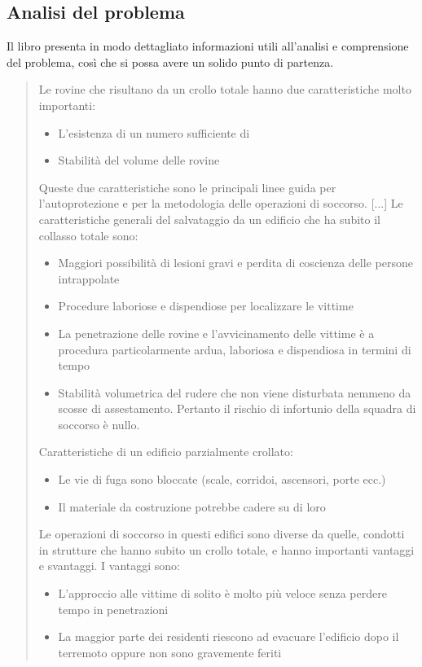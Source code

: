 \documentclass[main.tex]{subfiles}
\begin{document}
\subsection{Analisi del problema}\label{sec:analisi-problema}
Il libro \cite{searchAndRescue} presenta in modo dettagliato informazioni utili all'analisi e comprensione del problema, così che si possa avere un solido punto di partenza.
\begin{quote}
Le rovine che risultano da un crollo totale hanno due caratteristiche molto importanti:
\begin{itemize}
    \item L'esistenza di un numero sufficiente di 
    \item Stabilità del volume delle rovine
\end{itemize}
Queste due caratteristiche sono le principali linee guida per l'autoprotezione e per la metodologia delle operazioni di soccorso.
[...]\newline
Le caratteristiche generali del salvataggio da un edificio che ha
subito il collasso totale sono:
\begin{itemize}
    \item Maggiori possibilità di lesioni gravi e perdita di coscienza delle persone intrappolate
    \item Procedure laboriose e dispendiose per localizzare le vittime
    \item La penetrazione delle rovine e l'avvicinamento delle vittime è a procedura particolarmente ardua, laboriosa e dispendiosa in termini di tempo
    \item Stabilità volumetrica del rudere che non viene disturbata nemmeno da scosse di assestamento. Pertanto il rischio di infortunio della squadra di soccorso è nullo.
\end{itemize}

Caratteristiche di un edificio parzialmente crollato:
\begin{itemize}
    \item Le vie di fuga sono bloccate (scale, corridoi, ascensori, porte ecc.)
\item Il materiale da costruzione potrebbe cadere su di loro
\end{itemize}
Le operazioni di soccorso in questi edifici sono diverse da quelle, condotti in strutture che hanno subito un crollo totale, e hanno importanti vantaggi e svantaggi. I vantaggi sono:
\begin{itemize}
    \item L'approccio alle vittime di solito è molto più veloce senza perdere tempo in penetrazioni
\item La maggior parte dei residenti riescono ad evacuare l'edificio dopo il terremoto oppure non sono gravemente feriti
\end{itemize}


\end{quote}
\end{document}
